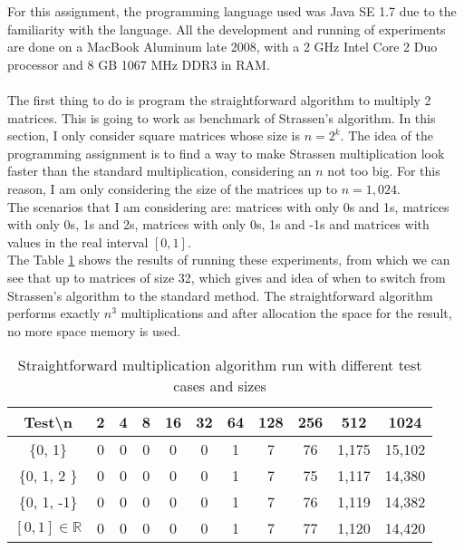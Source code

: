 \documentclass[tikz, 12pt]{scrartcl}
\begin{document}
For this assignment, the programming language used was Java SE 1.7 due to the familiarity with the language. All the development and running of experiments are done on a MacBook Aluminum late 2008, with a 2 GHz Intel Core 2 Duo processor and 8 GB 1067 MHz DDR3 in RAM. \\
\\
The first thing to do is program the straightforward algorithm to multiply 2 matrices. This is going to work as benchmark of Strassen's algorithm. In this section, I only consider square matrices whose size is $n = 2^k$. The idea of the programming assignment is to find a way to make Strassen multiplication look faster than the standard multiplication, considering an $n$ not too big. For this reason, I am only considering the size of the matrices up to $n = 1,024$. \\
The scenarios that I am considering are: matrices with only 0s and 1s, matrices with only 0s, 1s and 2s, matrices with only 0s, 1s and -1s and matrices with values in the real interval $[0, 1]$. \\
The Table \ref{straightforwardResults} shows the results of running these experiments, from which we can see that up to matrices of size 32, which gives and idea of when to switch from Strassen's algorithm to the standard method. The straightforward algorithm performs exactly $n^3$ multiplications and after allocation the space for the result, no more space memory is used.


\begin{table}[h!]
\caption{Straightforward multiplication algorithm run with different test cases and sizes\label{straightforwardResults}}
\centering
\begin{tabular}{|c|cccccccccc|}
\hline
Test\textbackslash  n		&	2	&	4	&	8	&	16	&	32	&	64	&	128	&	256	&	512	&	1024\\
\hline
\{0, 1\}				&	0	&	0	&	0	&	0	&	0	&	1	&	7	&	76	&	1,175	&	15,102\\
\{0, 1, 2 \}				&	0	&	0	&	0	&	0	&	0	&	1	&	7	&	75	&	1,117	&	14,380\\
\{0, 1, -1\}				&	0	&	0	&	0	&	0	&	0	&	1	&	7	&	76	&	1,119	&	14,382\\
$[0, 1] \in \mathbb{R}$	&	0	&	0	&	0	&	0	&	0	&	1	&	7	&	77	&	1,120	&	14,420\\
\hline
\end{tabular}
\end{table}
\end{document}
